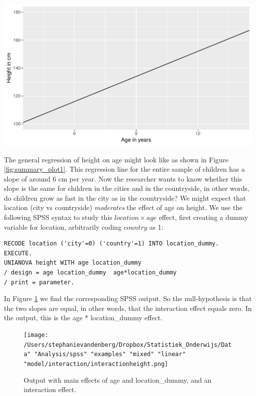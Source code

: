 \documentclass[]{report}\usepackage[]{graphicx}\usepackage[]{color}
\makeatletter
\def\maxwidth{ %
  \ifdim\Gin@nat@width>\linewidth
    \linewidth
  \else
    \Gin@nat@width
  \fi
}
\newenvironment{knitrout}{}{} %
\makeatother
\begin{document}
\begin{knitrout}
\color{fgcolor}

{\centering \includegraphics[width=\maxwidth]{figure/summary_plot1-1} 

}



\end{knitrout}

The general regression of height on age might look like as shown in Figure \ref{fig:summary_plot1}. This regression line for the entire sample of children has a slope of around 6 cm per year. Now the researcher wants to know whether this slope is the same for children in the cities and in the countryside, in other words, do children grow as fast in the city as in the countryside? We might expect that location (city vs countryside) \textit{moderates} the effect of age on height. We use the following SPSS syntax to study this $location \times age$ effect, first creating a dummy variable for location, arbitrarily coding $country$ as 1:

\begin{verbatim}
RECODE location ('city'=0) ('country'=1) INTO location_dummy.
EXECUTE.
UNIANOVA height WITH age location_dummy 
/ design = age location_dummy  age*location_dummy
/ print = parameter.
\end{verbatim}


In Figure \ref{fig:interactionheight} we find the corresponding SPSS output. So the null-hypothesis is that the two slopes are equal, in other words, that the interaction effect equals zero. In the output, this is the age * location\_dummy effect.


\begin{figure}[h]
    \begin{center}
       \texttt{[image: /Users/stephanievandenberg/Dropbox/Statistiek\_Onderwijs/Data" "Analysis/spss" "examples" "mixed" "linear" "model/interaction/interactionheight.png]}
    \end{center}
    \label{fig:interactionheight}
    \caption{Output with main effects of age and location\_dummy, and an interaction effect.}
\end{figure}
\end{document}
